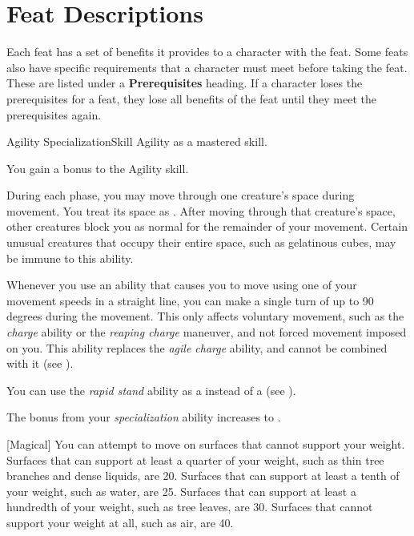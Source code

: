     \section{Feat Descriptions}
        Each feat has a set of benefits it provides to a character with the feat.
        Some feats also have specific requirements that a character must meet before taking the feat.
        These are listed under a \textbf{Prerequisites} heading.
        If a character loses the prerequisites for a feat, they lose all benefits of the feat until they meet the prerequisites again.

    \begin{feat}{Agility Specialization}{Skill}
        \featpre Agility as a mastered skill.

         You gain a  bonus to the Agility skill.

         During each phase, you may move through one creature's space during movement.
        You treat its space as .
        After moving through that creature's space, other creatures block you as normal for the remainder of your movement.
        Certain unusual creatures that occupy their entire space, such as gelatinous cubes, may be immune to this ability.

         Whenever you use an ability that causes you to move using one of your movement speeds in a straight line, you can make a single turn of up to 90 degrees during the movement. 
        This only affects voluntary movement, such as the \textit{charge} ability or the \textit{reaping charge} maneuver, and not forced movement imposed on you.
        This ability replaces the \textit{agile charge} ability, and cannot be combined with it (see ).

         You can use the \textit{rapid stand} ability as a  instead of a  (see ).

         The bonus from your \textit{specialization} ability increases to .

        [Magical] You can attempt to move on surfaces that cannot support your weight.
        Surfaces that can support at least a quarter of your weight, such as thin tree branches and dense liquids, are  20.
        Surfaces that can support at least a tenth of your weight, such as water, are  25.
        Surfaces that can support at least a hundredth of your weight, such as tree leaves, are  30.
        Surfaces that cannot support your weight at all, such as air, are  40.


\end{feat}
